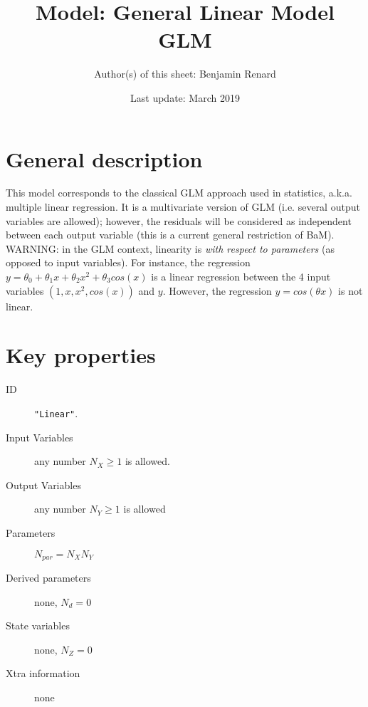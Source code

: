 \documentclass[a4paper]{article}
\title{Model: General Linear Model GLM}
\author{Author(s) of this sheet: Benjamin Renard}
\date{Last update: March 2019}
\begin{document}
\maketitle

\section{General description}
This model corresponds to the classical GLM approach used in statistics, a.k.a. multiple linear regression. It is a multivariate version of GLM (i.e. several output variables are allowed); however, the residuals will be considered as independent between each output variable (this is a current general restriction of BaM).\\
WARNING: in the GLM context, linearity is \emph{with respect to parameters} (as opposed to input variables). For instance, the regression $y=\theta_0+\theta_1x+\theta_2x^2+\theta_3 cos(x)$ is a linear regression between the 4 input variables $\left( 1,x,x^2,cos(x) \right)$ and $y$. However, the regression $y=cos( \theta x)$ is not linear.

\section{Key properties}

\begin{description}
\item[ID] \texttt{"Linear"}.

\item[Input Variables] any number $N_X \geq1$ is allowed.

\item[Output Variables] any number $N_Y \geq1$ is allowed

\item[Parameters] $N_{par}=N_X N_Y$

\item[Derived parameters] none, $N_{d}=0$

\item[State variables] none, $N_{Z}=0$

\item[Xtra information] none

\end{description}
\end{document}
